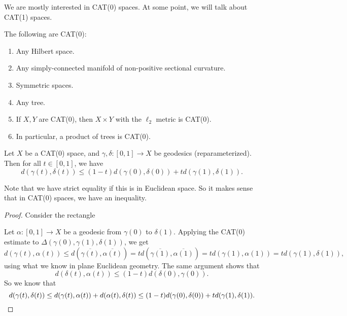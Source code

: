 \documentclass[a4paper]{article}
\begin{document}
We are mostly interested in CAT(0) spaces. At some point, we will talk about CAT(1) spaces.

\begin{eg}
  The following are CAT(0):
  \begin{enumerate}
    \item Any Hilbert space.
    \item Any simply-connected manifold of non-positive sectional curvature.
    \item Symmetric spaces.
    \item Any tree.
    \item If $X, Y$ are CAT(0), then $X \times Y$ with the $\ell_2$ metric is CAT(0).
    \item In particular, a product of trees is CAT(0).
  \end{enumerate}
\end{eg}

\begin{lemma}
  Let $X$ be a CAT(0) space, and $\gamma, \delta: [0, 1] \to X$ be geodesics (reparameterized). Then for all $t \in [0, 1]$, we have
  \[
    d(\gamma(t), \delta(t)) \leq (1 - t) d(\gamma(0), \delta(0)) + t d(\gamma(1), \delta(1)).
  \]
\end{lemma}
Note that we have strict equality if this is in Euclidean space. So it makes sense that in CAT(0) spaces, we have an inequality.
\begin{proof}
  Consider the rectangle
  \begin{center}
  \end{center}
  Let $\alpha: [0, 1] \to X$ be a geodesic from $\gamma(0)$ to $\delta(1)$. Applying the CAT(0) estimate to $\Delta(\gamma(0), \gamma(1), \delta(1))$, we get
  \[
    d(\gamma(t), \alpha(t)) \leq d(\overline{\gamma(t)}, \overline{\alpha(t)}) = t d(\overline{\gamma(1)}, \overline{\alpha(1)}) = t d(\gamma(1), \alpha(1)) = t d(\gamma(1), \delta(1)),
  \]
  using what we know in plane Euclidean geometry. The same argument shows that
  \[
    d(\delta(t), \alpha(t)) \leq (1 - t) d(\delta(0), \gamma(0)).
  \]
  So we know that
  \[
    d(\gamma(t), \delta(t)) \leq d(\gamma(t), \alpha(t)) + d(\alpha(t), \delta(t)) \leq (1 - t) d(\gamma(0), \delta(0)) + t d(\gamma(1), \delta(1)).\qedhere
  \]
\end{proof}
\end{document}
